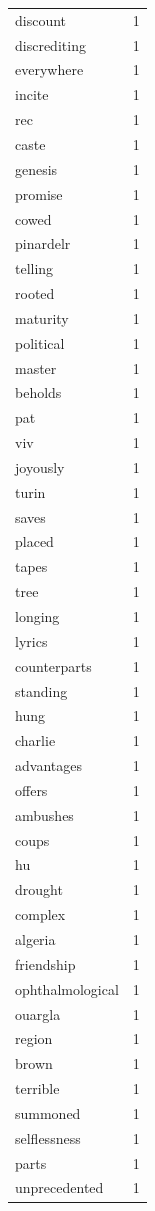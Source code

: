 \begin{tabular}{lr}
discount & 1 \\
discrediting & 1 \\
everywhere & 1 \\
incite & 1 \\
rec & 1 \\
caste & 1 \\
genesis & 1 \\
promise & 1 \\
cowed & 1 \\
pinardelr & 1 \\
telling & 1 \\
rooted & 1 \\
maturity & 1 \\
political & 1 \\
master & 1 \\
beholds & 1 \\
pat & 1 \\
viv & 1 \\
joyously & 1 \\
turin & 1 \\
saves & 1 \\
placed & 1 \\
tapes & 1 \\
tree & 1 \\
longing & 1 \\
lyrics & 1 \\
counterparts & 1 \\
standing & 1 \\
hung & 1 \\
charlie & 1 \\
advantages & 1 \\
offers & 1 \\
ambushes & 1 \\
coups & 1 \\
hu & 1 \\
drought & 1 \\
complex & 1 \\
algeria & 1 \\
friendship & 1 \\
ophthalmological & 1 \\
ouargla & 1 \\
region & 1 \\
brown & 1 \\
terrible & 1 \\
summoned & 1 \\
selflessness & 1 \\
parts & 1 \\
unprecedented & 1 \\

\end{tabular}

